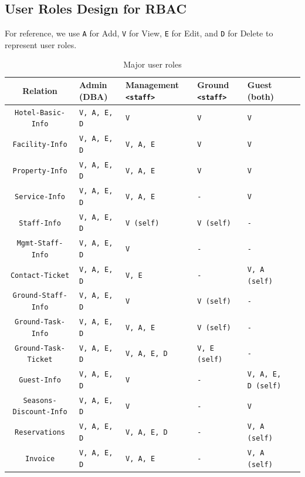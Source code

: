 \subsection{User Roles Design for RBAC}

For reference, we use \texttt{A} for Add, \texttt{V} for View, \texttt{E} for Edit, and \texttt{D} for Delete to represent user roles.

\begin{table}[H]
	\centering
	\begin{tabular}{clllll}
		\hline
		Relation & Admin (DBA) & Management \texttt{<staff>} & Ground \texttt{<staff>} & Guest (both) \\ \hline
		\texttt{Hotel-Basic-Info} & \texttt{V, A, E, D} & \texttt{V} & \texttt{V} & \texttt{V}  \\
		\texttt{Facility-Info} & \texttt{V, A, E, D} & \texttt{V, A, E} & \texttt{V} & \texttt{V}  \\
		\texttt{Property-Info} & \texttt{V, A, E, D} & \texttt{V, A, E} & \texttt{V} & \texttt{V}  \\
		\texttt{Service-Info} & \texttt{V, A, E, D} & \texttt{V, A, E} & \texttt{-} & \texttt{V}  \\
		\texttt{Staff-Info} & \texttt{V, A, E, D} & \texttt{V (self)} & \texttt{V (self)} & \texttt{-}  \\
		\texttt{Mgmt-Staff-Info} & \texttt{V, A, E, D} & \texttt{V} & \texttt{-} & \texttt{-}  \\
		\texttt{Contact-Ticket} & \texttt{V, A, E, D} & \texttt{V, E} & \texttt{-} & \texttt{V, A (self)}  \\
		\texttt{Ground-Staff-Info} & \texttt{V, A, E, D} & \texttt{V} & \texttt{V (self)} & \texttt{-}  \\
		\texttt{Ground-Task-Info} & \texttt{V, A, E, D} & \texttt{V, A, E} & \texttt{V (self)} & \texttt{-}  \\
		\texttt{Ground-Task-Ticket} & \texttt{V, A, E, D} & \texttt{V, A, E, D} & \texttt{V, E (self)} & \texttt{-}  \\
		\texttt{Guest-Info} & \texttt{V, A, E, D} & \texttt{V} & \texttt{-} & \texttt{V, A, E, D (self)}  \\
		\texttt{Seasons-Discount-Info} & \texttt{V, A, E, D} & \texttt{V} & \texttt{-} & \texttt{V}  \\
		\texttt{Reservations} & \texttt{V, A, E, D} & \texttt{V, A, E, D} & \texttt{-} & \texttt{V, A (self)}  \\
		\texttt{Invoice} & \texttt{V, A, E, D} & \texttt{V, A, E} & \texttt{-} & \texttt{V, A (self)}  \\
		\hline
	\end{tabular}
	\caption{Major user roles}
\end{table}

